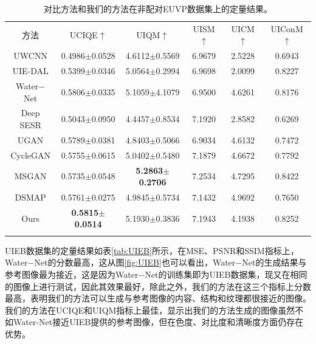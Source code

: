 \begin{table}[ht]%
\centering
\caption{对比方法和我们的方法在非配对EUVP数据集上的定量结果。}
  \begin{tabular}{c|cc|ccc}
    \hline\noalign{\smallskip}
    方法 &UCIQE$\uparrow$ & UIQM$\uparrow$ & UISM$\uparrow$ & UICM$\uparrow$ & UIConM$\uparrow$ \\
    \noalign{\smallskip}\hline\noalign{\smallskip}
    UWCNN\cite{li2020underwater} & 0.4986$\pm$0.0528 & 4.6112$\pm$0.5569 & 6.9679 & 2.5228 & 0.6943 \\
    UIE-DAL\cite{uplavikar2019all} & 0.5399$\pm$0.0346 & 5.0564$\pm$0.2994 & 6.9698 & 2.0099 & 0.8227 \\
    Water$-$Net\cite{li2019underwater} & 0.5806$\pm$0.0335 & 5.1059$\pm$4.1079 & 6.9500 & 4.6261 & 0.8176 \\
    Deep SESR\cite{islam2020simultaneous} & 0.5043$\pm$0.0950 & 4.4457$\pm$0.8534 & 7.1920 & 2.8582 & 0.6269 \\
    UGAN\cite{fabbri2018enhancing} & 0.5789$\pm$0.0381 & 4.8403$\pm$0.5066 & 6.9034 & 4.6132 & 0.7472 \\
    CycleGAN\cite{zhu2017unpaired} & 0.5755$\pm$0.0615 & 5.0402$\pm$0.5480 & 7.1879 & 4.6672 & 0.7792 \\
    MSGAN\cite{mao2019mode} & 0.5735$\pm$0.0548 & \textbf{5.2863$\pm$0.2706} & 7.2534 & 4.7295 & 0.8422 \\
    DSMAP\cite{chang2020domain} & 0.5761$\pm$0.0275 & 4.9845$\pm$0.5734 & 7.1432 & 4.9692 & 0.7650 \\
    Ours & \textbf{0.5815$\pm$0.0514} & 5.1930$\pm$0.3836 & 7.1943 & 4.1938 & 0.8252 \\
    \noalign{\smallskip}\hline
  \end{tabular}
  \label{tab:euvp_unpaired}
\end{table}

UIEB数据集的定量结果如表\ref{tab:UIEB}所示，在MSE、PSNR和SSIM指标上，Water$-$Net的分数最高，这从图\ref{fig:UIEB}也可以看出，Water$-$Net的生成结果与参考图像最为接近，这是因为Water$-$Net的训练集即为UIEB数据集，现又在相同的图像上进行测试，因此其效果最好，除此之外，我们的方法在这三个指标上分数最高，表明我们的方法可以生成与参考图像的内容、结构和纹理都很接近的图像。我们的方法在UCIQE和UIQM指标上最佳，显示出我们的方法生成的图像虽然不如Water-Net接近UIEB提供的参考图像，但在色度、对比度和清晰度方面仍存在优势。

